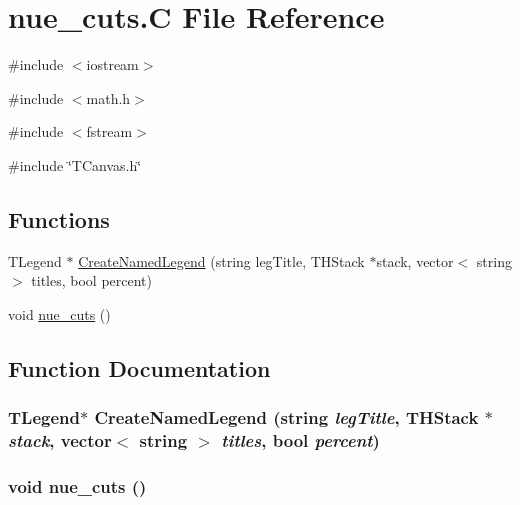 \hypertarget{nue__cuts_8C}{
\section{nue\_\-cuts.C File Reference}
\label{nue__cuts_8C}
}
{\ttfamily \#include $<$iostream$>$}\par
{\ttfamily \#include $<$math.h$>$}\par
{\ttfamily \#include $<$fstream$>$}\par
{\ttfamily \#include \char`\"{}TCanvas.h\char`\"{}}\par
\subsection*{Functions}
\begin{DoxyCompactItemize}
\item 
TLegend $\ast$ \hyperlink{nue__cuts_8C_a8188ddbc4f225306acb50c18a178dfb4}{CreateNamedLegend} (string legTitle, THStack $\ast$stack, vector$<$ string $>$ titles, bool percent)
\item 
void \hyperlink{nue__cuts_8C_ad4d992414249987ddba0a1ee0d8dd9b6}{nue\_\-cuts} ()
\end{DoxyCompactItemize}


\subsection{Function Documentation}
\hypertarget{nue__cuts_8C_a8188ddbc4f225306acb50c18a178dfb4}{
\subsubsection[{CreateNamedLegend}]{\setlength{\rightskip}{0pt plus 5cm}TLegend$\ast$ CreateNamedLegend (string {\em legTitle}, \/  THStack $\ast$ {\em stack}, \/  vector$<$ string $>$ {\em titles}, \/  bool {\em percent})}}
\label{nue__cuts_8C_a8188ddbc4f225306acb50c18a178dfb4}
\hypertarget{nue__cuts_8C_ad4d992414249987ddba0a1ee0d8dd9b6}{
\subsubsection[{nue\_\-cuts}]{\setlength{\rightskip}{0pt plus 5cm}void nue\_\-cuts ()}}
\label{nue__cuts_8C_ad4d992414249987ddba0a1ee0d8dd9b6}
